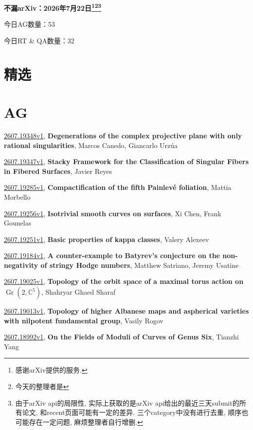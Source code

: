 \documentclass[9pt, a4paper]{article}
\theoremstyle{plain}
\theoremstyle{definition}
\theoremstyle{remark}
\newcommand{\arxiv}[3]{\href{https://arxiv.org/abs/#1}{#1}, \textbf{\textcolor{arxivblue}{#2}}, #3}
\newcommand{\AGnumber}{53}
\newcommand{\RTQAnumber}{32}
\newcommand{\NewestDate}{2026年7月22日}
\newcommand{\todayarXiver}{} %
\begin{document}
\begin{center}
    \Huge\textbf{不漏arXiv：\NewestDate\footnote{感谢arXiv提供的服务.}\footnote{今天的整理者是\todayarXiver}\footnote{由于arXiv api的局限性, 实际上获取的是arXiv api给出的最近三天submit的所有论文, 和recent页面可能有一定的差异. 三个category中没有进行去重, 顺序也可能存在一定问题, 麻烦整理者自行增删.}} \\
\end{center}

\setcounter{section}{-1}

\begin{center}
    今日AG数量：\AGnumber
    
    今日RT \& QA数量：\RTQAnumber
    
\end{center}


\section{精选}


\section{AG}
\arxiv{2607.19348v1}{Degenerations of the complex projective plane with only rational singularities}{Marcos Canedo, Giancarlo Urzúa}

\arxiv{2607.19347v1}{Stacky Framework for the Classification of Singular Fibers in Fibered Surfaces}{Javier Reyes}

\arxiv{2607.19285v1}{Compactification of the fifth Painlevé foliation}{Mattia Morbello}

\arxiv{2607.19256v1}{Isotrivial smooth curves on surfaces}{Xi Chen, Frank Gounelas}

\arxiv{2607.19251v1}{Basic properties of kappa classes}{Valery Alexeev}

\arxiv{2607.19184v1}{A counter-example to Batyrev's conjecture on the non-negativity of stringy Hodge numbers}{Matthew Satriano, Jeremy Usatine}

\arxiv{2607.19025v1}{Topology of the orbit space of a maximal torus action on $\operatorname{Gr}(2,\mathbb{C}^{5})$}{Shahryar Ghaed Sharaf}

\arxiv{2607.19013v1}{Topology of higher Albanese maps and aspherical varieties with nilpotent fundamental group}{Vasily Rogov}

\arxiv{2607.18992v1}{On the Fields of Moduli of Curves of Genus Six}{Tianzhi Yang}
\end{document}
